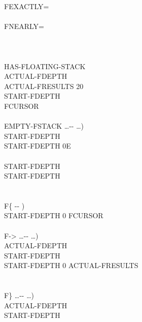 \begin{tt}
\tab[3]  FEXACTLY= \\
\tab[2]  \\
\tab[3]  FNEARLY= \\
\tab[2]  \word{;} \\
\word[tools]{[THEN]} \\
\\
HAS-FLOATING-STACK \word[tools]{[IF]} \\
\tab {} ACTUAL-FDEPTH \\
\tab {} ACTUAL-FRESULTS 20   \\
\tab {} START-FDEPTH \\
\tab {} FCURSOR \\
\\
\tab \word{:} EMPTY-FSTACK  \ldots -{}- \ldots ) \\
\tab[2]  START-FDEPTH    \\
\tab[3]    START-FDEPTH    0E  \\
\tab[2]  \\
\tab[2]  START-FDEPTH    \\
\tab[3]    START-FDEPTH     \\
\tab[2]  \word{;} \\
\\
\tab \word{:} F\{  -{}- ) \\
\tab[2]  START-FDEPTH \word{!} 0 FCURSOR \word{!} \word{;} \\
\\
\tab \word{:} F->  \ldots -{}- \ldots ) \\
\tab[2]   ACTUAL-FDEPTH \word{!} \\
\tab[2] START-FDEPTH    \\
\tab[2.5]    START-FDEPTH  \word{-} 0  ACTUAL-FRESULTS   \word{+}   \\
\tab[2]  \word{;} \\
\\
\tab \word{:} F\}  \ldots -{}- \ldots ) \\
\tab[2]  ACTUAL-FDEPTH  \word{=}  \\
\tab[3]   START-FDEPTH    \\

\end{tt}
